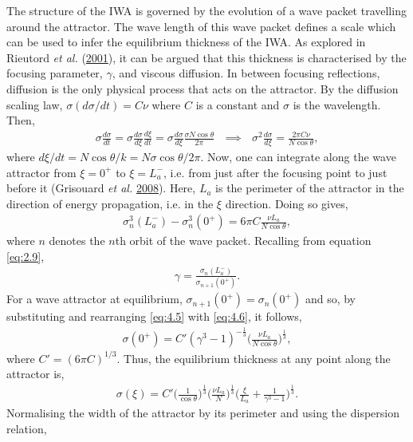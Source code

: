 \documentclass[a4paper]{article}
\numberwithin{equation}{section}
\begin{document}
The structure of the IWA is governed by the evolution of a wave packet travelling around the attractor. The wave length of this wave packet defines a scale which can be used to infer the equilibrium thickness of the IWA. As explored in Rieutord \emph{et al.} (\hyperlink{ref 12}{2001}), it can be argued that this thickness is characterised by the focusing parameter, $\gamma$, and viscous diffusion. In between focusing reflections, diffusion is the only physical process that acts on the attractor. By the diffusion scaling law, $\sigma(d\sigma/dt) = C\nu$ where $C$ is a constant and $\sigma$ is the wavelength. Then,
\begin{align*}
\sigma \frac{d\sigma}{dt} = \sigma \frac{d\sigma}{d\xi} \frac{d\xi}{dt} = \sigma \frac{d\sigma}{d\xi} \frac{\sigma N\cos\theta}{2\pi} ~~~ \implies ~~~ \sigma^2 \frac{d\sigma}{d\xi} = \frac{2\pi C\nu}{N\cos\theta},
\end{align*}
where $d\xi/dt = N\cos\theta/k = N\sigma \cos\theta/2\pi$. Now, one can integrate along the wave attractor from $\xi = 0^+$ to $\xi = L^{-}_a$, i.e. from just after the focusing point to just before it (Grisouard \emph{et al.} \hyperlink{ref 25}{2008}). Here, $L_a$ is the perimeter of the attractor in the direction of energy propagation, i.e. in the $\xi$ direction. Doing so gives, 
\begin{align}\label{eq:4.5}
\sigma^3_n(L^{-}_a) - \sigma^3_n(0^+) = 6\pi C \frac{\nu L_a}{N\cos\theta}, 
\end{align}
where $n$ denotes the $n$th orbit of the wave packet. Recalling from equation \eqref{eq:2.9},
\begin{align}\label{eq:4.6}
\gamma = \frac{\sigma_n(L^{-}_a)}{\sigma_{n+1}(0^+)}.
\end{align}
For a wave attractor at equilibrium, $\sigma_{n+1}(0^+) = \sigma_{n}(0^+)$ and so, by substituting and rearranging \eqref{eq:4.5} with \eqref{eq:4.6}, it follows, 
\begin{align*}
\sigma(0^+) = C'(\gamma^3 - 1)^{-\frac{1}{3}} \bigg(\frac{\nu L_a}{N\cos\theta} \bigg)^{\frac{1}{3}},
\end{align*}
where $C' = (6\pi C)^{1/3}$. Thus, the equilibrium thickness at any point along the attractor is,
\begin{align*}
\sigma(\xi) = C' \bigg(\frac{1}{\cos\theta}\bigg)^{\frac{1}{3}}\bigg(\frac{\nu L_a}{N} \bigg)^{\frac{1}{3}} \bigg( \frac{\xi}{L_a} + \frac{1}{\gamma^3 - 1}\bigg)^{\frac{1}{3}}.
\end{align*}
Normalising the width of the attractor by its perimeter and using the dispersion relation, 
\end{document}
